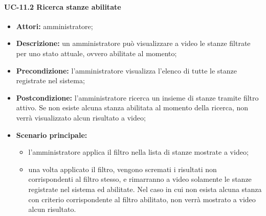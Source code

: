 \paragraph{UC-11.2 Ricerca stanze abilitate}
\begin{itemize}
    \item \textbf{Attori:} amministratore;
    \item \textbf{Descrizione:} un amministratore pu\`{o} visualizzare a video le stanze filtrate per uno stato attuale, ovvero abilitate al momento;
    \item \textbf{Precondizione:} l'amministratore visualizza l'elenco di tutte le stanze registrate nel sistema;
    \item \textbf{Postcondizione:} l'amministratore ricerca un insieme di stanze tramite filtro attivo. Se non esiste alcuna stanza abilitata al momento della ricerca, non verrà visualizzato alcun risultato a video;
    \item \textbf{Scenario principale:}
    \begin{itemize}
        \item l'amministratore applica il filtro nella lista di stanze mostrate a video;
        \item una volta applicato il filtro, vengono scremati i risultati non corrispondenti al filtro stesso, e rimarranno a video solamente le stanze registrate nel sistema ed abilitate. Nel caso in cui non esista alcuna stanza con criterio corrispondente al filtro abilitato, non verrà mostrato a video alcun risultato.
    \end{itemize}
\end{itemize}


